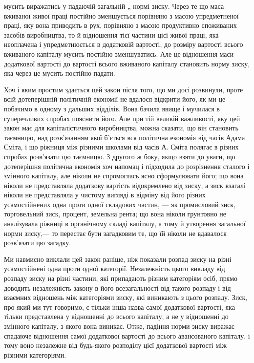 \documentclass[12pt, a4paper, final]{memoir}
\begin{document}
мусить виражатись у падаючій загальній „ нормі зиску. Через те що маса вживаної живої праці постійно зменшується порівняно з масою упредметненої праці, яку вона приводить в рух, порівняно з масою продуктивно споживаних засобів виробництва, то й відношення тієї частини цієї живої праці, яка неоплачена і упредметнюється в додатковій вартості, до розміру вартості всього вживаного капіталу мусить постійно зменшуватись. Але це відношення маси додаткової вартості до вартості всього вживаного капіталу становить норму зиску, яка через це мусить постійно падати.

Хоч і яким простим здається цей закон після того, що ми досі розвинули, проте всій дотеперішній політичній економії не вдалося відкрити його, як ми це побачимо в одному з дальших відділів. Вона бачила явище і мучилася в суперечливих спробах пояснити його. Але при тій великій важливості, яку цей закон має для капіталістичного виробництва, можна сказати, що він становить таємницю, над розв’язанням якої б’ється вся політична економія від часів Адама Сміта, і що ріжниця між різними школами від часів А. Сміта полягає в різних спробах розв’язати цю таємницю. З другого ж боку, якщо взяти до уваги, що дотеперішня політична економія хоч напомац і підходила до розрізнення сталого і змінного капіталу, але ніколи не спромоглась ясно сформулювати його; що вона ніколи не представляла додаткову вартість відокремлено від зиску, а зиск взагалі ніколи не представляла у чистому вигляді в відміну від його різних усамостійнених одна проти одної складових частин, — як промисловий зиск, торговельний зиск, процент, земельна рента; що вона ніколи грунтовно не аналізувала ріжниці в органічному складі капіталу, а тому й утворення загальної норми зиску,— то перестає бути загадковим те, що їй ніколи не вдавалося розв’язати цю загадку.

Ми навмисно виклали цей закон раніше, ніж показали розпад зиску на різні усамостійнені одна проти одної категорії. Незалежність цього викладу від розпаду зиску на різні частини, які припадають різним категоріям осіб, прямо доводить незалежність закону в його всезагальності від такого розпаду і від взаємних відношень між категоріями зиску, які виникають з цього розпаду. Зиск, про який ми тут говоримо, є тільки інша назва самої додаткової вартості, яка тільки представлена у відношенні до всього капіталу, а не у відношенні до змінного капіталу, з якого вона виникає. Отже, падіння норми зиску виражає спадаюче відношення самої додаткової вартості до всього авансованого капіталу, і тому воно незалежне від будь-якого розподілу цієї додаткової вартості між різними категоріями.
\end{document}
